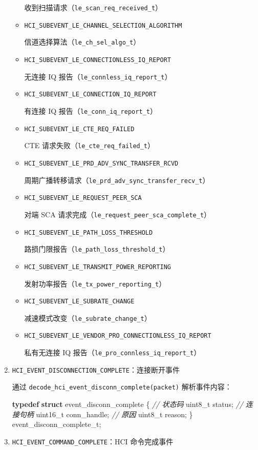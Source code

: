 \documentclass[
  12pt,
]{book}
\newenvironment{Shaded}{\begin{snugshade}}{\end{snugshade}}
\newcommand{\CommentTok}[1]{\textcolor[rgb]{0.56,0.35,0.01}{\textit{#1}}}
\newcommand{\DataTypeTok}[1]{\textcolor[rgb]{0.13,0.29,0.53}{#1}}
\newcommand{\KeywordTok}[1]{\textcolor[rgb]{0.13,0.29,0.53}{\textbf{#1}}}
\newcommand{\NormalTok}[1]{#1}
\begin{document}
\begin{enumerate}
\begin{itemize}
    收到扫描请求（\texttt{le\_scan\_req\_received\_t}）
  \item
    \texttt{HCI\_SUBEVENT\_LE\_CHANNEL\_SELECTION\_ALGORITHM}

    信道选择算法（\texttt{le\_ch\_sel\_algo\_t}）
  \item
    \texttt{HCI\_SUBEVENT\_LE\_CONNECTIONLESS\_IQ\_REPORT}

    无连接 IQ 报告（\texttt{le\_connless\_iq\_report\_t}）
  \item
    \texttt{HCI\_SUBEVENT\_LE\_CONNECTION\_IQ\_REPORT}

    有连接 IQ 报告（\texttt{le\_conn\_iq\_report\_t}）
  \item
    \texttt{HCI\_SUBEVENT\_LE\_CTE\_REQ\_FAILED}

    CTE 请求失败（\texttt{le\_cte\_req\_failed\_t}）
  \item
    \texttt{HCI\_SUBEVENT\_LE\_PRD\_ADV\_SYNC\_TRANSFER\_RCVD}

    周期广播转移请求（\texttt{le\_prd\_adv\_sync\_transfer\_recv\_t}）
  \item
    \texttt{HCI\_SUBEVENT\_LE\_REQUEST\_PEER\_SCA}

    对端 SCA 请求完成（\texttt{le\_request\_peer\_sca\_complete\_t}）
  \item
    \texttt{HCI\_SUBEVENT\_LE\_PATH\_LOSS\_THRESHOLD}

    路损门限报告（\texttt{le\_path\_loss\_threshold\_t}）
  \item
    \texttt{HCI\_SUBEVENT\_LE\_TRANSMIT\_POWER\_REPORTING}

    发射功率报告（\texttt{le\_tx\_power\_reporting\_t}）
  \item
    \texttt{HCI\_SUBEVENT\_LE\_SUBRATE\_CHANGE}

    减速模式改变（\texttt{le\_subrate\_change\_t}）
  \item
    \texttt{HCI\_SUBEVENT\_LE\_VENDOR\_PRO\_CONNECTIONLESS\_IQ\_REPORT}

    私有无连接 IQ 报告（\texttt{le\_pro\_connless\_iq\_report\_t}）
  \end{itemize}
\item
  \texttt{HCI\_EVENT\_DISCONNECTION\_COMPLETE}：连接断开事件

  通过 \texttt{decode\_hci\_event\_disconn\_complete(packet)} 解析事件内容：

\begin{Shaded}
\begin{Highlighting}[]
\KeywordTok{typedef} \KeywordTok{struct}\NormalTok{ event_disconn_complete}
\NormalTok{\{}
    \CommentTok{// 状态码}
    \DataTypeTok{uint8_t}\NormalTok{ status;}
    \CommentTok{// 连接句柄}
    \DataTypeTok{uint16_t}\NormalTok{ conn_handle;}
    \CommentTok{// 原因}
    \DataTypeTok{uint8_t}\NormalTok{ reason;}
\NormalTok{\} event_disconn_complete_t;}
\end{Highlighting}
\end{Shaded}
\item
  \texttt{HCI\_EVENT\_COMMAND\_COMPLETE}：HCI 命令完成事件


\end{enumerate}
\end{document}
